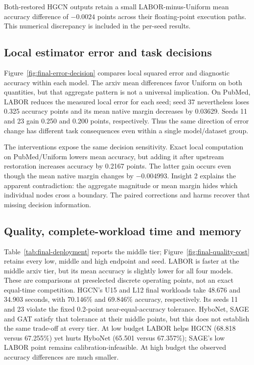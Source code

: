 \documentclass[sigconf, nonacm]{acmart}
\begin{document}
Both-restored HGCN outputs retain a small LABOR-minus-Uniform mean accuracy difference of $-0.0024$ points across their floating-point execution paths. This numerical discrepancy is included in the per-seed results.

\subsection{Local estimator error and task decisions}
\FinalErrorDecisionFigure
Figure~\ref{fig:final-error-decision} compares local squared error and diagnostic accuracy within each model. The arxiv mean differences favor Uniform on both quantities, but that aggregate pattern is not a universal implication. On PubMed, LABOR reduces the measured local error for each seed; seed 37 nevertheless loses 0.325 accuracy points and its mean native margin decreases by 0.03629. Seeds 11 and 23 gain 0.250 and 0.200 points, respectively. Thus the same direction of error change has different task consequences even within a single model/dataset group.

The interventions expose the same decision sensitivity. Exact local computation on PubMed/Uniform lowers mean accuracy, but adding it after upstream restoration increases accuracy by 0.2167 points. The latter gain occurs even though the mean native margin changes by $-0.004993$. Insight 2 explains the apparent contradiction: the aggregate magnitude or mean margin hides which individual nodes cross a boundary. The paired corrections and harms recover that missing decision information.

\subsection{Quality, complete-workload time and memory}
Table~\ref{tab:final-deployment} reports the middle tier; Figure~\ref{fig:final-quality-cost} retains every low, middle and high endpoint and seed. LABOR is faster at the middle arxiv tier, but its mean accuracy is slightly lower for all four models. These are comparisons at preselected discrete operating points, not an exact equal-time competition. HGCN's U15 and L12 final workloads take 48.676 and 34.903 seconds, with 70.146\% and 69.846\% accuracy, respectively. Its seeds 11 and 23 violate the fixed 0.2-point near-equal-accuracy tolerance. HyboNet, SAGE and GAT satisfy that tolerance at their middle points, but this does not establish the same trade-off at every tier. At low budget LABOR helps HGCN (68.818 versus 67.255\%) yet hurts HyboNet (65.501 versus 67.357\%); SAGE's low LABOR point remains calibration-infeasible. At high budget the observed accuracy differences are much smaller.
\end{document}
